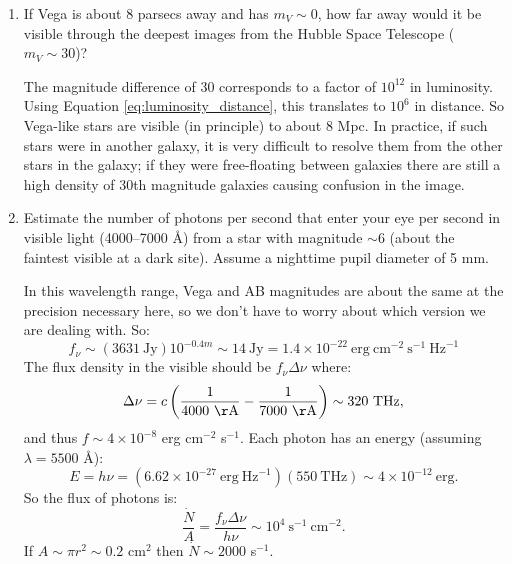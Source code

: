\begin{enumerate} 
\item If Vega is about 8 parsecs away and has $m_V \sim 0$, how far
  away would it be visible through the deepest images from the Hubble
  Space Telescope ($m_V\sim 30$)?

\begin{answer}
  The magnitude difference of 30
    corresponds to a factor of $10^{12}$ in luminosity. Using Equation
    \ref{eq:luminosity_distance}, this translates to $10^6$ in
    distance. So Vega-like stars are visible (in principle) to about 8
    Mpc. In practice, if such stars were in another galaxy, it is very
    difficult to resolve them from the other stars in the galaxy; if
    they were free-floating between galaxies there are still a high
    density of 30th magnitude galaxies causing confusion in the image.
\end{answer}

\item Estimate the number of photons per second that enter your eye
    per second in visible light (4000--7000 \AA) from a star with
  magnitude $\sim 6$ (about the faintest visible at a dark
  site). Assume a nighttime pupil diameter of 5 mm.

\begin{answer}
In this wavelength range, Vega and AB magnitudes are about the same at
the precision necessary here, so we don't have to worry about which
version we are dealing with. So:
\begin{equation}
f_\nu \sim (3631 \mathrm{~Jy}) 10^{-0.4 m} \sim 14 \mathrm{~Jy} = 1.4 \times
10^{-22} \mathrm{~erg} \mathrm{~cm}^{-2} \mathrm{~s}^{-1} \mathrm{~Hz}^{-1}
\end{equation}
The flux density in the visible should be $f_\nu \Delta\nu$ where:
\begin{equation}
\Delta\nu = c \left(\frac{1}{4000 \mathrm{~\AA}} -
\frac{1}{7000 \mathrm{~\AA}}\right) \sim 320 \mathrm{~THz},
\end{equation}
and thus $f \sim 4\times 10^{-8}$ erg cm$^{-2}$ s$^{-1}$. Each photon
has an energy (assuming $\lambda = 5500$ \AA):
\begin{equation}
E = h\nu = (6.62\times
10^{-27} \mathrm{~erg~Hz}^{-1})( \mathrm{550~THz}) \sim 4 \times
10^{-12} \mathrm{~erg}.
\end{equation}
So the flux of photons is:
\begin{equation}
\frac{\dot N}{A} = \frac{f_\nu \Delta\nu}{h\nu} \sim 
10^4 \mathrm{~s}^{-1} \mathrm{~cm}^{-2}.
\end{equation}
If $A \sim \pi r^2 \sim 0.2$ cm$^2$ then $\dot N \sim 2000$
s$^{-1}$.


\end{answer}
\end{enumerate}
